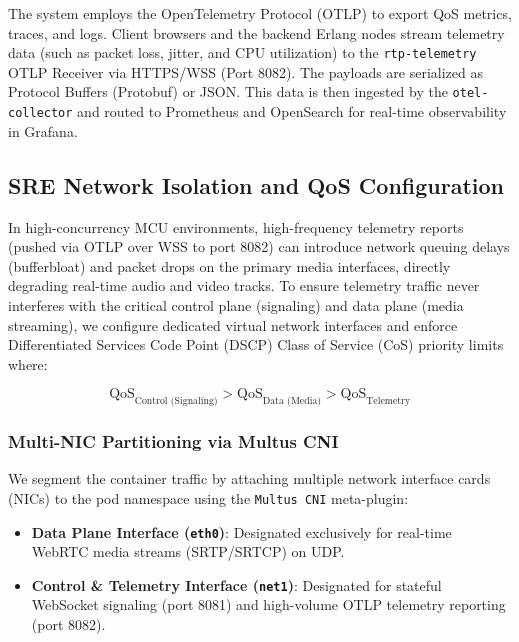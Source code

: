 \documentclass{article}
\begin{document}
The system employs the OpenTelemetry Protocol (OTLP) to export QoS metrics, traces, and logs.
Client browsers and the backend Erlang nodes stream telemetry data (such as packet loss, jitter,
and CPU utilization) to the \texttt{rtp-telemetry} OTLP Receiver via HTTPS/WSS (Port 8082).
The payloads are serialized as Protocol Buffers (Protobuf) or JSON. This data is then ingested
by the \texttt{otel-collector} and routed to Prometheus and OpenSearch for real-time observability in Grafana.

\subsection{SRE Network Isolation and QoS Configuration}
\label{sec:sre-qos-isolation}

In high-concurrency MCU environments, high-frequency telemetry reports (pushed via OTLP over WSS to port 8082)
can introduce network queuing delays (bufferbloat) and packet drops on the primary media interfaces, directly
degrading real-time audio and video tracks. To ensure telemetry traffic never interferes with the critical
control plane (signaling) and data plane (media streaming), we configure dedicated virtual network interfaces
and enforce Differentiated Services Code Point (DSCP) Class of Service (CoS) priority limits where:

\begin{equation}
\text{QoS}_{\text{Control (Signaling)}} > \text{QoS}_{\text{Data (Media)}} > \text{QoS}_{\text{Telemetry}}
\end{equation}

\subsubsection{Multi-NIC Partitioning via Multus CNI}

We segment the container traffic by attaching multiple network interface cards (NICs) to the pod
namespace using the \texttt{Multus CNI} meta-plugin:

\begin{itemize}
    \item \textbf{Data Plane Interface (\texttt{eth0})}:
          Designated exclusively for real-time WebRTC media streams (SRTP/SRTCP) on UDP.
    \item \textbf{Control \& Telemetry Interface (\texttt{net1})}:
          Designated for stateful WebSocket signaling (port 8081) and high-volume OTLP telemetry reporting (port 8082).
\end{itemize}
\end{document}
